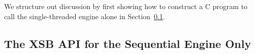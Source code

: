 We structure out discussion by first showing how to construct a C
program to call the single-threaded engine alone in
Section~\ref{sec:CXSBSeq}.

\subsection{The XSB API for the Sequential Engine Only} \label{sec:CXSBSeq}

